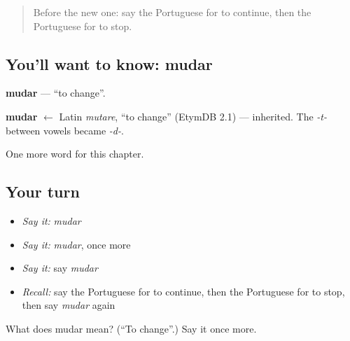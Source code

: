 \label{lesson:PT-C139-mudar}



\begin{quote}
Before the new one: say the Portuguese for to continue, then the Portuguese for to stop.
\end{quote}

\subsection*{You'll want to know: mudar}
\textbf{mudar} — \textquotedblleft{}to change\textquotedblright{}.

\begin{cousinweb}
\textbf{mudar} $\leftarrow$ Latin \emph{mutare}, \textquotedblleft{}to change\textquotedblright{} (EtymDB 2.1) — inherited. The \emph{-t-} between vowels became \emph{-d-}.
\end{cousinweb}

\begin{grammarlens}[title={What you've built}]
One more word for this chapter.
\end{grammarlens}

\subsection*{Your turn}
\begin{itemize}
\raggedright
  \item \emph{Say it:} \emph{mudar}
  \item \emph{Say it:} \emph{mudar}, once more
  \item \emph{Say it:} say \emph{mudar}
  \item \emph{Recall:} say the Portuguese for to continue, then the Portuguese for to stop, then say \emph{mudar} again
\end{itemize}

\begin{tcolorbox}[breakable,colback=teal!4,colframe=teal!35!black,title={Before you move on}]
What does mudar mean? (\textquotedblleft{}To change\textquotedblright{}.) Say it once more.
\end{tcolorbox}
